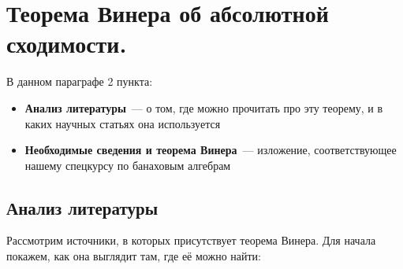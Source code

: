 \documentclass[12pt]{extarticle}
\theoremstyle{definition}
\begin{document}
    \section[Теорема Винера.]{Теорема Винера об абсолютной сходимости.}
    В данном параграфе 2 пункта:
	\begin{itemize}
		\item \textbf{Анализ литературы}~--- о том, где можно прочитать про эту теорему, и в каких научных статьях она используется
		\item \textbf{Необходимые сведения и теорема Винера}~--- изложение, соответствующее нашему спецкурсу по банаховым алгебрам
	\end{itemize}
    \subsection{Анализ литературы}
    Рассмотрим источники, в которых присутствует теорема Винера. Для начала покажем, как она выглядит там, где её можно найти:
\end{document}
